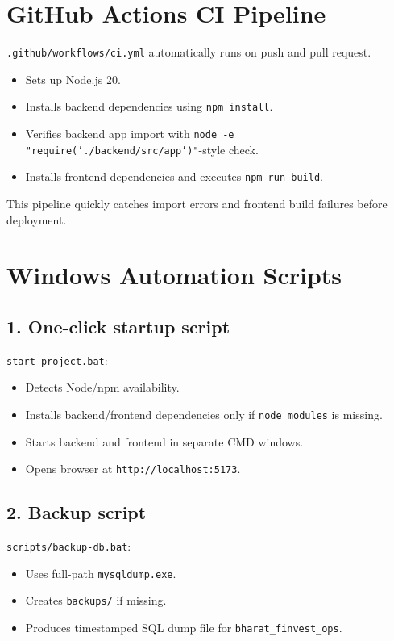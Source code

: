 \section{GitHub Actions CI Pipeline}
\texttt{.github/workflows/ci.yml} automatically runs on push and pull request.

\begin{itemize}[leftmargin=1.3cm]
\item Sets up Node.js 20.
\item Installs backend dependencies using \texttt{npm install}.
\item Verifies backend app import with \texttt{node -e "require('./backend/src/app')"}-style check.
\item Installs frontend dependencies and executes \texttt{npm run build}.
\end{itemize}

This pipeline quickly catches import errors and frontend build failures before deployment.

\section{Windows Automation Scripts}
\subsection*{1. One-click startup script}
\texttt{start-project.bat}:
\begin{itemize}[leftmargin=1.3cm]
\item Detects Node/npm availability.
\item Installs backend/frontend dependencies only if \texttt{node\_modules} is missing.
\item Starts backend and frontend in separate CMD windows.
\item Opens browser at \texttt{http://localhost:5173}.
\end{itemize}

\subsection*{2. Backup script}
\texttt{scripts/backup-db.bat}:
\begin{itemize}[leftmargin=1.3cm]
\item Uses full-path \texttt{mysqldump.exe}.
\item Creates \texttt{backups/} if missing.
\item Produces timestamped SQL dump file for \texttt{bharat\_finvest\_ops}.
\end{itemize}

